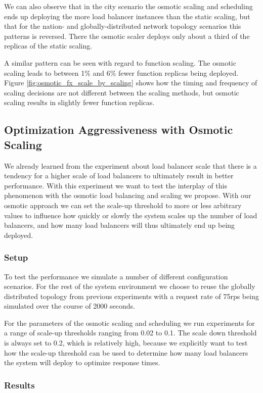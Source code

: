 \documentclass[draft,final]{vutinfth} %
\begin{document}
We can also observe that in the city scenario the osmotic scaling and scheduling ends up deploying the more load balancer instances than the static scaling, but that for the nation- and globally-distributed network topology scenarios this patterns is reversed. There the osmotic scaler deploys only about a third of the replicas of the static scaling.

A similar pattern can be seen with regard to function scaling.
The osmotic scaling leads to between 1\% and 6\% fewer function replicas being deployed. Figure \ref{fig:osmotic_fx_scale_by_scaling} shows how the timing and frequency of scaling decisions are not different between the scaling methods, but osmotic scaling results in slightly fewer function replicas. 
\subsection{Optimization Aggressiveness with Osmotic Scaling}
We already learned from the experiment about load balancer scale that there is a tendency for a higher scale of load balancers to ultimately result in better performance.
With this experiment we want to test the interplay of this phenomenon with the osmotic load balancing and scaling we propose. With our osmotic approach we can set the scale-up threshold to more or less arbitrary values to influence how quickly or slowly the system scales up the number of load balancers, and how many load balancers will thus ultimately end up being deployed.

\subsubsection{Setup}
To test the performance we simulate a number of different configuration scenarios. For the rest of the system environment we choose to reuse the globally distributed topology from previous experiments with a request rate of 75\gls{rps} being simulated over the course of 2000 seconds.

For the parameters of the osmotic scaling and scheduling we run experiments for a range of scale-up thresholds ranging from 0.02 to 0.1.
The scale down threshold is always set to 0.2, which is relatively high, because we explicitly want to test how the scale-up threshold can be used to determine how many load balancers the system will deploy to optimize response times.

\subsubsection{Results}
\end{document}
